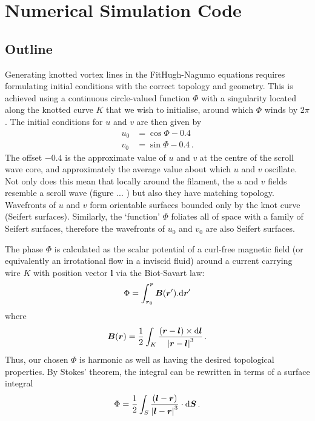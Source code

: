 \documentclass[notitlepage,aps,amsmath,amssymb,11pt]{revtex4-1}
\newcommand{\norm}[1]{\left| #1 \right|}
\renewcommand{\vec}[1]{\boldsymbol{#1}}
\begin{document}
\section{Numerical Simulation Code}

\subsection{Outline}

Generating knotted vortex lines in the FitHugh-Nagumo equations requires formulating initial conditions with the correct topology and geometry. This is achieved using a continuous circle-valued function $\Phi$ with a singularity located along the knotted curve $K$ that we wish to initialise, around which $\Phi$ winds by $2 \pi$. The initial conditions for $u$ and $v$ are then given by \cite{Sutcliffe2003}
\begin{align}
\label{uinit} u_0 &= \cos{\Phi} - 0.4\\
\label{vinit} v_0 &= \sin{\Phi} - 0.4 \, .
\end{align}
The offset $-0.4$ is the approximate value of $u$ and $v$ at the centre of the scroll wave core, and approximately the average value about which $u$ and $v$ oscillate. Not only does this mean that locally around the filament, the $u$ and $v$ fields resemble a scroll wave (figure ... ) but also they have matching topology. Wavefronts of $u$ and $v$ form orientable surfaces bounded only by the knot curve (Seifert surfaces). Similarly, the `function' $\Phi$ foliates all of space with a family of Seifert surfaces, therefore the wavefronts of $u_0$ and $v_0$ are also Seifert surfaces.

The phase $\Phi$ is calculated as the scalar potential of a curl-free magnetic field (or equivalently an irrotational flow in a inviscid fluid) around a current carrying wire $K$ with position vector $\vec{l}$ via the Biot-Savart law:
\begin{align}
\label{phik} \Phi = \int_{\vec{r}_0}^{\vec{r}} \vec{B}(\vec{r}') . {\rm d} \vec{r}'
\end{align}
where
\begin{align}
\label{B} \vec{B}(\vec{r}) = \frac{1}{2} \int_K \frac{(\vec{r} - \vec{l})\times {\rm d} \vec{l}}{\norm{\vec{r} - \vec{l}}^3} \, .
\end{align}
Thus, our chosen $\Phi$ is harmonic as well as having the desired topological properties. By Stokes' theorem, the integral can be rewritten in terms of a surface integral
\begin{align}
\label{phis} \Phi = \frac{1}{2} \int_S \frac{( \vec{l} - \vec{r} )}{\norm{ \vec{l} - \vec{r} }^3 }\cdot {\rm d} \vec{S} \, .
\end{align}
\end{document}
